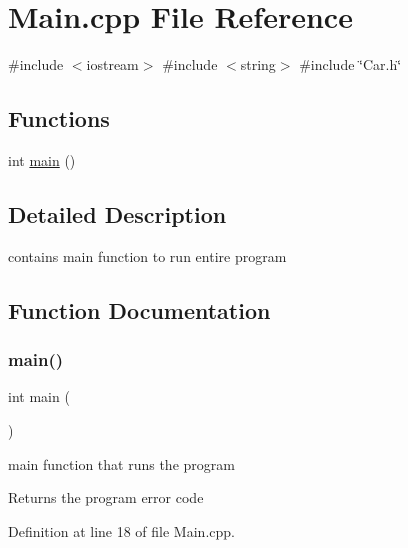 \section{Main.\+cpp File Reference}
\label{_main_8cpp}
{\ttfamily \#include $<$iostream$>$}\newline
{\ttfamily \#include $<$string$>$}\newline
{\ttfamily \#include \char`\"{}Car.\+h\char`\"{}}\newline
\subsection*{Functions}
\begin{DoxyCompactItemize}
\item 
int \hyperlink{_main_8cpp_ae66f6b31b5ad750f1fe042a706a4e3d4}{main} ()
\end{DoxyCompactItemize}


\subsection{Detailed Description}
contains main function to run entire program 

\subsection{Function Documentation}
\mbox{\label{_main_8cpp_ae66f6b31b5ad750f1fe042a706a4e3d4}} 
\subsubsection{\texorpdfstring{main()}{main()}}
{\footnotesize\ttfamily int main (\begin{DoxyParamCaption}{ }\end{DoxyParamCaption})}

main function that runs the program

\begin{DoxyReturn}{Returns}
the program error code 
\end{DoxyReturn}


Definition at line 18 of file Main.\+cpp.

